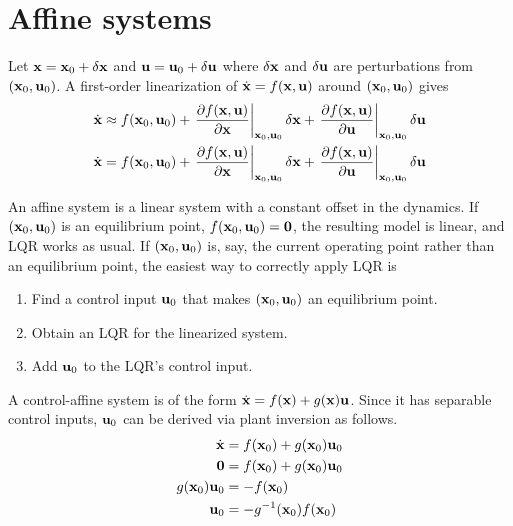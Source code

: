 \section{Affine systems}

Let $\mathbf{x} = \mathbf{x}_0 + \delta\mathbf{x}$ and
$\mathbf{u} = \mathbf{u}_0 + \delta\mathbf{u}$ where $\delta\mathbf{x}$ and $\delta\mathbf{u}$
are perturbations from $(\mathbf{x}_0, \mathbf{u}_0)$. A first-order linearization of
$\dot{\mathbf{x}} = f(\mathbf{x}, \mathbf{u})$ around $(\mathbf{x}_0, \mathbf{u}_0)$ gives
\begin{align*}
  \dot{\mathbf{x}} &\approx f(\mathbf{x}_0, \mathbf{u}_0) +
    \left.\frac{\partial f(\mathbf{x}, \mathbf{u})}{\partial \mathbf{x}}
    \right|_{\mathbf{x}_0, \mathbf{u}_0}\delta\mathbf{x} +
    \left.\frac{\partial f(\mathbf{x}, \mathbf{u})}{\partial \mathbf{u}}
    \right|_{\mathbf{x}_0, \mathbf{u}_0}\delta\mathbf{u} \\
  \dot{\mathbf{x}} &= f(\mathbf{x}_0, \mathbf{u}_0) +
    \left.\frac{\partial f(\mathbf{x}, \mathbf{u})}{\partial \mathbf{x}}
    \right|_{\mathbf{x}_0, \mathbf{u}_0}\delta\mathbf{x} +
    \left.\frac{\partial f(\mathbf{x}, \mathbf{u})}{\partial \mathbf{u}}
    \right|_{\mathbf{x}_0, \mathbf{u}_0}\delta\mathbf{u} \\
\end{align*}

An affine system is a linear system with a constant offset in the dynamics. If
$(\mathbf{x}_0, \mathbf{u}_0)$ is an equilibrium point,
$f(\mathbf{x}_0, \mathbf{u}_0) = \mathbf{0}$, the resulting \gls{model} is linear, and
LQR works as usual. If $(\mathbf{x}_0, \mathbf{u}_0)$ is, say, the current operating
point rather than an equilibrium point, the easiest way to correctly apply LQR
is
\begin{enumerate}
  \item Find a control input $\mathbf{u}_0$ that makes $(\mathbf{x}_0, \mathbf{u}_0)$ an
    equilibrium point.
  \item Obtain an LQR for the linearized system.
  \item Add $\mathbf{u}_0$ to the LQR's control input.
\end{enumerate}

A control-affine system is of the form
$\dot{\mathbf{x}} = f(\mathbf{x}) + g(\mathbf{x})\mathbf{u}$. Since it has separable control
inputs, $\mathbf{u}_0$ can be derived via plant inversion as follows.
\begin{align}
  \dot{\mathbf{x}} &= f(\mathbf{x}_0) + g(\mathbf{x}_0)\mathbf{u}_0 \nonumber \\
  \mathbf{0} &= f(\mathbf{x}_0) + g(\mathbf{x}_0)\mathbf{u}_0 \nonumber \\
  g(\mathbf{x}_0)\mathbf{u}_0 &= -f(\mathbf{x}_0) \nonumber \\
  \mathbf{u}_0 &= -g^{-1}(\mathbf{x}_0) f(\mathbf{x}_0)
\end{align}

